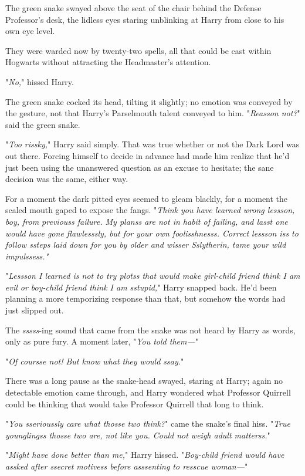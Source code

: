 The green snake swayed above the seat of the chair behind the Defense 
Professor's desk, the lidless eyes staring unblinking at Harry from close to 
his own eye level.

They were warded now by twenty-two spells, all that could be cast within 
Hogwarts without attracting the Headmaster's attention.

"\emph{No,}" hissed Harry.

The green snake cocked its head, tilting it slightly; no emotion was conveyed 
by the gesture, not that Harry's Parselmouth talent conveyed to him. 
"\emph{Reasson not?}" said the green snake.

"\emph{Too rissky,}" Harry said simply. That was true whether or not the Dark 
Lord was out there. Forcing himself to decide in advance had made him realize 
that he'd just been using the unanswered question as an excuse to hesitate; the 
sane decision was the same, either way.

For a moment the dark pitted eyes seemed to gleam blackly, for a moment the 
scaled mouth gaped to expose the fangs. "\emph{Think you have learned wrong 
lessson, boy, from previouss failure. My planss are not in habit of failing, 
and lasst one would have gone flawlesssly, but for your own foolisshnesss. 
Correct lessson iss to follow ssteps laid down for you by older and wisser 
Sslytherin, tame your wild impulssess."}

"\emph{Lessson I learned is not to try plotss that would make girl-child friend 
think I am evil or boy-child friend think I am sstupid,}" Harry snapped back. 
He'd been planning a more temporizing response than that, but somehow the words 
had just slipped out.

The \emph{sssss}-ing sound that came from the snake was not heard by Harry as 
words, only as pure fury. A moment later, "\emph{You told them---}"

"\emph{Of coursse not! But know what they would ssay.}"

There was a long pause as the snake-head swayed, staring at Harry; again no 
detectable emotion came through, and Harry wondered what Professor Quirrell 
could be thinking that would take Professor Quirrell that long to think.

"\emph{You sserioussly care what thosse two think?}" came the snake's final 
hiss. "\emph{True younglingss thosse two are, not like you. Could not weigh 
adult matterss.}"

"\emph{Might have done better than me,}" Harry hissed. "\emph{Boy-child friend 
would have assked after ssecret motivess before asssenting to resscue woman---}"

